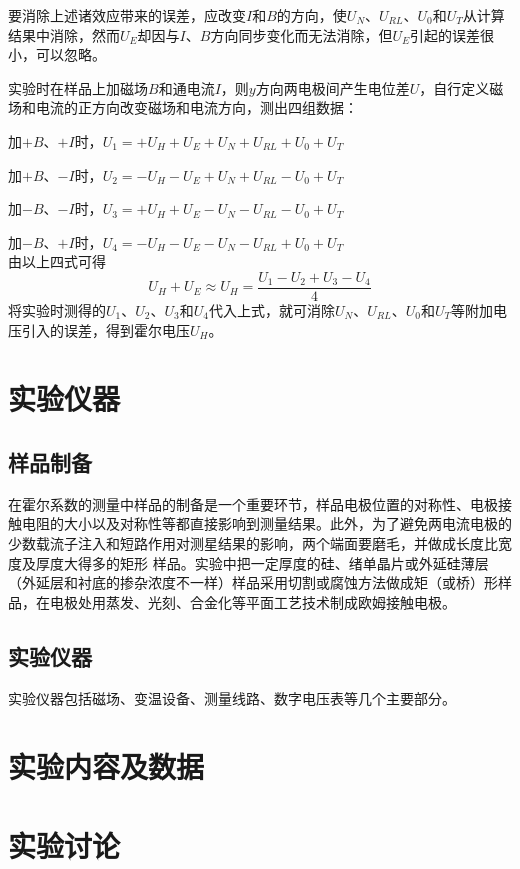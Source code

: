 \documentclass[a4paper]{article}
\begin{document}
要消除上述诸效应带来的误差，应改变$I$和$B$的方向，使$U_N$、$U_{RL}$、$U_0$和$U_T$从计算结果中消除，然而$U_E$却因与$I$、$B$方向同步变化而无法消除，但$U_E$引起的误差很小，可以忽略。

实验时在样品上加磁场$B$和通电流$I$，则$y$方向两电极间产生电位差$U$，自行定义磁场和电流的正方向改变磁场和电流方向，测出四组数据：

加$+B$、$+I$时，$U_1=+U_H+U_E+U_N+U_{RL}+U_0+U_T$

加$+B$、$-I$时，$U_2=-U_H-U_E+U_N+U_{RL}-U_0+U_T$

加$-B$、$-I$时，$U_3=+U_H+U_E-U_N-U_{RL}-U_0+U_T$

加$-B$、$+I$时，$U_4=-U_H-U_E-U_N-U_{RL}+U_0+U_T$\\
由以上四式可得
\begin{equation}\label{6.1.17}
U_H+U_E\approx U_H=\frac{U_1-U_2+U_3-U_4}{4}
\end{equation}
将实验时测得的$U_1$、$U_2$、$U_3$和$U_4$代入上式，就可消除$U_N$、$U_{RL}$、$U_0$和$U_T$等附加电压引入的误差，得到霍尔电压$U_H$。


\section{实验仪器}
\subsection{样品制备}
在霍尔系数的测量中样品的制备是一个重要环节，样品电极位置的对称性、电极接触电阻的大小以及对称性等都直接影响到测量结果。此外，为了避免两电流电极的少数载流子注入和短路作用对测星结果的影响，两个端面要磨毛，并做成长度比宽度及厚度大得多的矩形 样品。实验中把一定厚度的硅、绪单晶片或外延硅薄层（外延层和衬底的掺杂浓度不一样）样品采用切割或腐蚀方法做成矩（或桥）形样品，在电极处用蒸发、光刻、合金化等平面工艺技术制成欧姆接触电极。

\subsection{实验仪器}
实验仪器包括磁场、变温设备、测量线路、数字电压表等几个主要部分。

\section{实验内容及数据}


\section{实验讨论}
\end{document}
